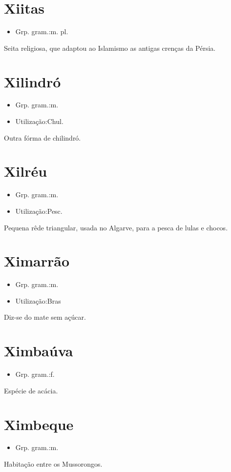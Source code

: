 \section{Xiitas}
\begin{itemize}
\item {Grp. gram.:m. pl.}
\end{itemize}
Seita religiosa, que adaptou ao Islamismo as antigas crenças da Pérsia.
\section{Xilindró}
\begin{itemize}
\item {Grp. gram.:m.}
\end{itemize}
\begin{itemize}
\item {Utilização:Chul.}
\end{itemize}
Outra fórma de \textunderscore chilindró\textunderscore .
\section{Xilréu}
\begin{itemize}
\item {Grp. gram.:m.}
\end{itemize}
\begin{itemize}
\item {Utilização:Pesc.}
\end{itemize}
Pequena rêde triangular, usada no Algarve, para a pesca de lulas e chocos.
\section{Ximarrão}
\begin{itemize}
\item {Grp. gram.:m.}
\end{itemize}
\begin{itemize}
\item {Utilização:Bras}
\end{itemize}
Diz-se do mate sem açúcar.
\section{Ximbaúva}
\begin{itemize}
\item {Grp. gram.:f.}
\end{itemize}
Espécie de acácia.
\section{Ximbeque}
\begin{itemize}
\item {Grp. gram.:m.}
\end{itemize}
Habitação entre os Mussorongos.
